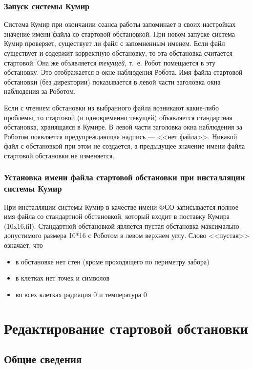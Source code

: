 \documentclass[12pt,a4paper]{article}
\begin{document}
\subsubsection{Запуск системы Кумир}

Система Кумир при окончании сеанса работы запоминает в своих настройках  значение имени файла со стартовой обстановкой.  При новом запуске система Кумир проверяет, существует ли файл с запомненным именем. Если файл существует и содержит корректную обстановку, то эта обстановка считается стартовой. Она же объявляется \emph{текущей}, т.~е. Робот помещается в эту обстановку. Это отображается в окне наблюдения Робота. Имя файла стартовой обстановки (без директории) показывается в левой части заголовка окна наблюдения за Роботом.

Если с чтением обстановки из выбранного файла возникают какие-либо проблемы, то стартовой (и одновременно текущей) объявляется стандартная обстановка, хранящаяся в Кумире. В левой части заголовка окна наблюдения за Роботом появляется предупреждающая надпись --- <<нет файла>>. Никакой файл с обстановкой при этом не создается, а предыдущее значение имени файла стартовой обстановки не изменяется.

\subsubsection{Установка имени файла стартовой обстановки  при инсталляции системы Кумир}

При инсталляции системы Кумир в качестве имени ФСО  записывается полное имя файла со стандартной обстановкой, который входит в поставку Кумира (10x16.fil). Стандартной обстановкой является пустая обстановка максимально допустимого размера 10*16 с Роботом в левом верхнем углу. Слово <<пустая>> означает, что
\begin{itemize}
\item в обстановке нет стен (кроме проходящего по периметру забора)
\item в клетках нет точек и символов
\item во всех клетках радиация 0 и температура 0
\end{itemize}

\section{Редактирование стартовой обстановки}
\label{robotedit}

\subsection{Общие сведения}
\label{roboteditcommon}
\end{document}
